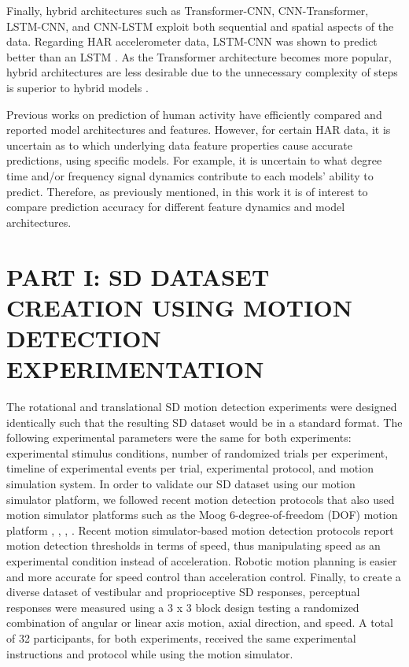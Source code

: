 \documentclass{ieeeaccess}
\begin{document}
Finally, hybrid architectures such as Transformer-CNN, CNN-Transformer, LSTM-CNN, and CNN-LSTM exploit both sequential and spatial aspects of the data. Regarding HAR accelerometer data, LSTM-CNN was shown to predict better than an LSTM \cite{Xia_2020_LSTMCNN}. As the Transformer architecture becomes more popular, hybrid architectures are less desirable due to the unnecessary complexity of steps is superior to hybrid models \cite{Dirgova_2022_Wearable}.

Previous works on prediction of human activity have efficiently compared and reported model architectures and features.  However, for certain HAR data, it is uncertain as to which underlying data feature properties cause accurate predictions, using specific models.  For example, it is uncertain to what degree time and/or frequency signal dynamics contribute to each models' ability to predict. Therefore, as previously mentioned, in this work it is of interest to compare prediction accuracy for different feature dynamics and model architectures.




\section{PART I: SD DATASET CREATION USING MOTION DETECTION EXPERIMENTATION}
The rotational and translational SD motion detection experiments were designed identically such that the resulting SD dataset would be in a standard format. The following experimental parameters were the same for both experiments: experimental stimulus conditions, number of randomized trials per experiment, timeline of experimental events per trial, experimental protocol, and motion simulation system. In order to validate our SD dataset using our motion simulator platform, we followed recent motion detection protocols that also used motion simulator platforms such as the Moog 6-degree-of-freedom (DOF) motion platform \cite{BermudezRey_2016_Vestibular}, \cite{Hartmann_2014_Direction}, \cite{Karmali_2017_Multivariate}, \cite{Valko_2012_Vestibular}. Recent motion simulator-based motion detection protocols report motion detection thresholds in terms of speed, thus manipulating speed as an experimental condition instead of acceleration. Robotic motion planning is easier and more accurate for speed control than acceleration control. Finally, to create a diverse dataset of vestibular and proprioceptive SD responses, perceptual responses were measured using a 3 x 3 block design testing a randomized combination of angular or linear axis motion, axial direction, and speed. A total of 32 participants, for both experiments, received the same experimental instructions and protocol while using the motion simulator.
\end{document}
